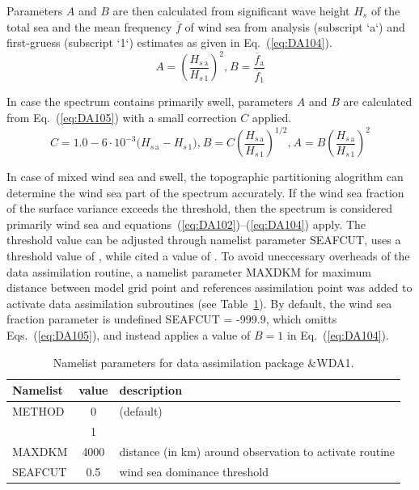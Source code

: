 Parameters $A$ and $B$ are then calculated from significant wave height $H_s$
of the total sea and the mean frequency $\overline{f}$ of wind sea from
analysis (subscript `a`) and first-gruess (subscript `1`) estimates as given in Eq.~(\ref{eq:DA104}).
\begin{equation}\label{eq:DA104}
A = \left ( \frac{H_{s\,\mathrm{a}}}{H_{s\,1}} \right )^2\text{,}\ 
B = \frac{\overline{f}_\mathrm{a}}{\overline{f}_1}
\end{equation}

In case the spectrum contains primarily swell, parameters
$A$ and $B$ are calculated from Eq.~(\ref{eq:DA105}) with a small correction $C$ applied.
\begin{equation}\label{eq:DA105}
C = 1.0 - 6\cdot 10^{-3} \bigl ( H_{s\,\mathrm{a}} - H_{s\,1} \bigr )\text{,}\ 
B = C \left (  \frac{H_{s\,\mathrm{a}}}{H_{s\,1}} \right )^{1/2}\text{,}\ 
A = B \left ( \frac{H_{s\,\mathrm{a}}}{H_{s\,1}} \right )^{2}
\end{equation}

In case of mixed wind sea and swell, the topographic partitioning alogrithm
can determine the wind sea part of the spectrum accurately. If the wind sea
fraction of the surface variance exceeds the threshold,
then the spectrum is considered primarily wind sea and
equations~(\ref{eq:DA102})--(\ref{eq:DA104}) apply.
The threshold value can be adjusted through namelist parameter {\code SEAFCUT},
\citeauthor{art:LGJ92} uses a threshold value of {}, while
\citeauthor{art:TGLDAS22} cited a value of {}. To avoid uneccessary
overheads of the data assimilation routine, a namelist parameter {\code MAXDKM} for
maximum distance between model grid point and references assimilation point was
added to activate data assimilation subroutines (see Table~\ref{tab:DA1_par}).
By default, the wind sea fraction parameter is undefined {\code SEAFCUT = -999.9},
which omitts Eqs.~(\ref{eq:DA105}), and instead applies a value of $B=1$
in Eq.~(\ref{eq:DA104}).


\begin{table} \begin{center}
\begin{tabular}{|l|c|l|} \hline \hline
  Namelist  &  value   & description \\
\hline
   METHOD   &  0    &  \citet{art:VMH97} (default) \\
            &  1    &  \citet{GY2004} \\
   MAXDKM   & 4000  &  distance (in km) around observation to activate routine \\
   SEAFCUT  &  0.5  &  wind sea dominance threshold \\
  \hline \hline
\end{tabular} \end{center}
\caption{Namelist parameters for data assimilation package {\code \&WDA1}.}
\label{tab:DA1_par} \botline \end{table}


